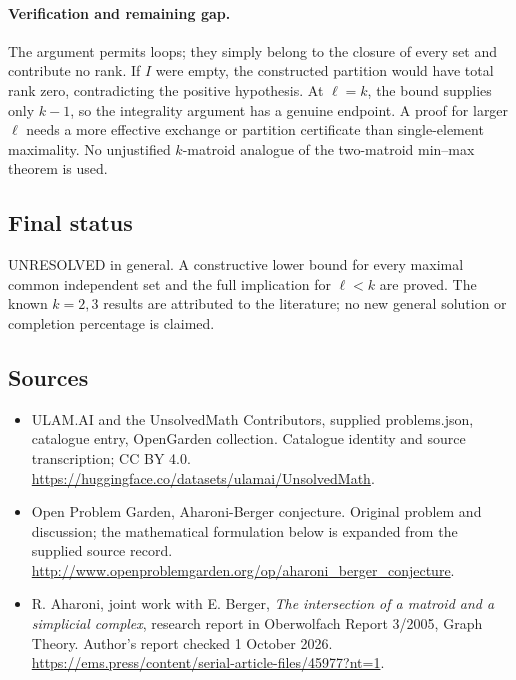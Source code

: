 \documentclass[11pt,a4paper]{article}
\begin{document}
\paragraph{Verification and remaining gap.}
The argument permits loops; they simply belong to the closure of every
set and contribute no rank. If $I$ were empty, the constructed partition
would have total rank zero, contradicting the positive hypothesis.
At $\ell=k$, the bound supplies only $k-1$, so the integrality argument
has a genuine endpoint. A proof for larger $\ell$ needs a more effective
exchange or partition certificate than single-element maximality. No
unjustified $k$-matroid analogue of the two-matroid min--max theorem is used.

\subsection{Final status}
UNRESOLVED in general. A constructive lower bound for every maximal
common independent set and the full implication for $\ell<k$ are
proved. The known $k=2,3$ results are attributed to the literature;
no new general solution or completion percentage is claimed.

\subsection{Sources}
\begin{itemize}
\item[S1] ULAM.AI and the UnsolvedMath Contributors, supplied problems.json, catalogue entry, OpenGarden collection. Catalogue identity and source transcription; CC BY 4.0.
\url{https://huggingface.co/datasets/ulamai/UnsolvedMath}.
\item[S2] Open Problem Garden, Aharoni-Berger conjecture. Original problem and discussion; the mathematical formulation below is expanded from the supplied source record.
\url{http://www.openproblemgarden.org/op/aharoni_berger_conjecture}.
\item[S3] R. Aharoni, joint work with E. Berger, \emph{The intersection of a matroid and a simplicial complex}, research report in Oberwolfach Report 3/2005, Graph Theory. Author's report checked 1 October 2026.
\url{https://ems.press/content/serial-article-files/45977?nt=1}.
\end{itemize}
\end{document}
